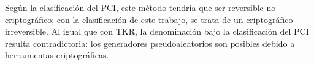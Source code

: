 
Según la clasificación del PCI, este método tendría que ser reversible no
criptográfico; con la clasificación de este trabajo, se trata de un
criptográfico irreversible. Al igual que con TKR, la denominación bajo la
clasificación del PCI resulta contradictoria: los generadores pseudoaleatorios
son posibles debido a herramientas criptográficas.
